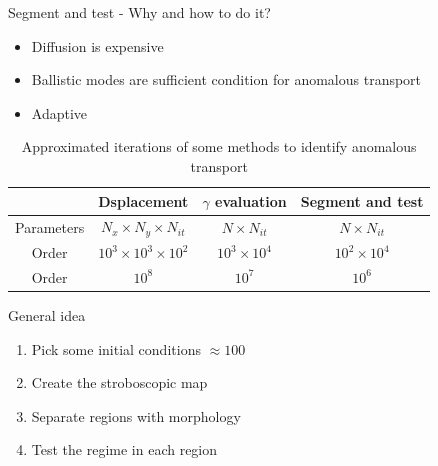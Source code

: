 \documentclass[10pt]{beamer}
\begin{document}
\begin{frame}{Segment and test - Why and how to do it?}
 
    \begin{itemize}
        \item Diffusion is expensive
        \item Ballistic modes are sufficient condition for anomalous transport
        \item Adaptive 
    \end{itemize}

\begin{table}
    \begin{tabular}{c|c|c|c}
            &   Dsplacement & $\gamma$ evaluation & Segment and test\\
        \hline
        Parameters & $N_x \times N_y \times N_{it}$ & $N \times N_{it}$ & $N \times N_{it}$\\
        \hline
        Order & $10^{3} \times 10^{3} \times 10^{2}$  & $10^3 \times 10^4$ & $10^2 \times 10^4$\\
        \hline
        Order & $10^{8}$ & $10^{7}$ & $10^6$\\ 
    \end{tabular}
    \caption{Approximated iterations of some methods to identify anomalous transport}
\end{table}
    
\end{frame}

\begin{frame}{General idea}
    
    \begin{enumerate}
        \item Pick some initial conditions $\approx 100$
        \item Create the stroboscopic map
        \item Separate regions with morphology
        \item Test the regime in each region
    \end{enumerate}
\end{frame}
\end{document}
